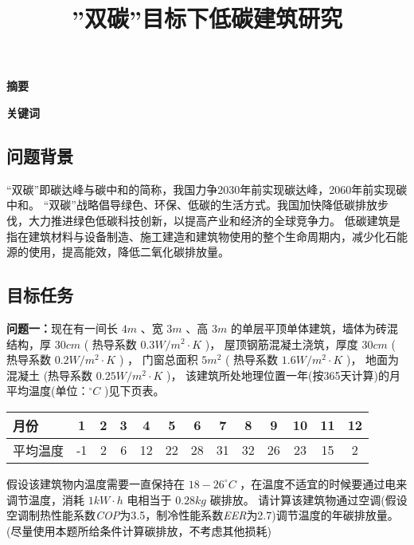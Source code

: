 \documentclass[a4paper, 12pt]{article}
\numberwithin{equation}{section}
\begin{document}
    \title{''双碳''目标下低碳建筑研究}
    \author{}
    \date{}
    \maketitle

    \centerline{\textbf{\LARGE{摘要}}}

    \textbf{\Large{关键词}}

    {}
        \subsection{问题背景}
        “双碳”即碳达峰与碳中和的简称，我国力争2030年前实现碳达峰，2060年前实现碳中和。
        “双碳”战略倡导绿色、环保、低碳的生活方式。我国加快降低碳排放步伐，大力推进绿色低碳科技创新，以提高产业和经济的全球竞争力。
        低碳建筑是指在建筑材料与设备制造、施工建造和建筑物使用的整个生命周期内，减少化石能源的使用，提高能效，降低二氧化碳排放量。

        \subsection{目标任务}
            \textbf{问题一：}现在有一间长 $ 4 m $ 、宽 $ 3 m $ 、高 $ 3 m $ 的单层平顶单体建筑，墙体为砖混结构，厚 $ 30 cm $ ( 热导系数 $ 0.3 W / m^{2} \cdot K $ )，
            屋顶钢筋混凝土浇筑，厚度 $ 30 cm $ ( 热导系数 $ 0.2 W / m^{2} \cdot K $ ) ，
            门窗总面积 $ 5 m^{2} $ ( 热导系数 $ 1.6 W / m^{2} \cdot K $ )，
            地面为混凝土 (热导系数 $ 0.25 W / m^{2} \cdot K $ )，
            该建筑所处地理位置一年(按365天计算)的月平均温度(单位：$ ^{\circ} C $ )见下页表。 \\
            \begin{table}
                \centering
                \begin{tabular}{|l|c|c|c|c|c|c|c|c|c|c|c|c|} \hline
                    月份 & 1 & 2 & 3 & 4 & 5 & 6 & 7 & 8 & 9 & 10 & 11 & 12 \\ \hline
                    平均温度 & -1 & 2 & 6 & 12 & 22 & 28 & 31 & 32 & 26 & 23 & 15 & 2\\ \hline
                \end{tabular}
            \end{table}
            假设该建筑物内温度需要一直保持在 $ 18 - 26 ^{\circ}C $ ，在温度不适宜的时候要通过电来调节温度，消耗 $ 1 kW \cdot h $ 电相当于 $ 0.28kg $ 碳排放。
            请计算该建筑物通过空调(假设空调制热性能系数\textit{COP}为3.5，制冷性能系数\textit{EER}为2.7)调节温度的年碳排放量。
            (尽量使用本题所给条件计算碳排放，不考虑其他损耗)
\end{document}
